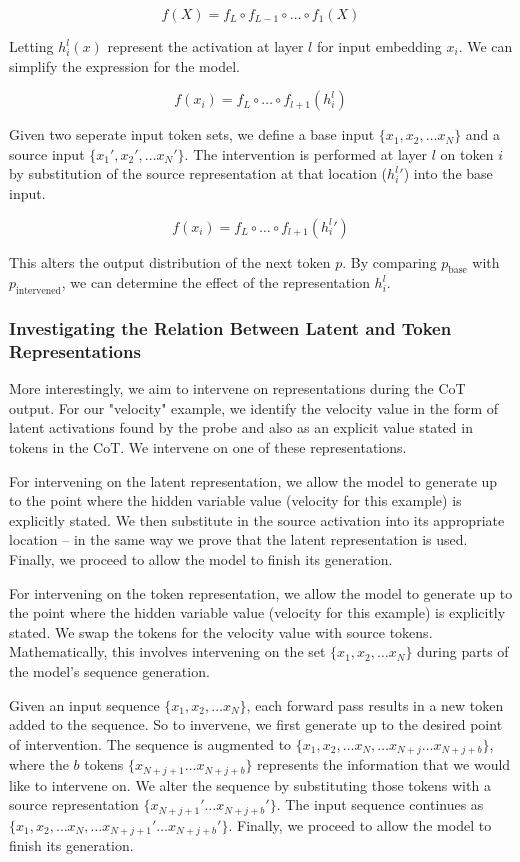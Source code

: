 \documentclass[11pt]{article}
\begin{document}
$$f(X) = f_L \circ f_{L-1}\circ \dots \circ f_1(X)$$

Letting $h_i^l(x)$ represent the activation at layer $l$ for input embedding $x_i$. We can simplify the expression for the model. 

$$f(x_i)=f_L \circ \dots \circ f_{l+1}(h_i^l)$$

Given two seperate input token sets, we define a base input $\{x_1, x_2, \dots x_N\}$ and a source input $\{x_1', x_2', \dots x_N'\}$. The intervention is performed at layer $l$ on token $i$ by substitution of the source representation at that location ($h_i^l'$) into the base input. 

$$f(x_i)=f_L \circ \dots \circ f_{l+1}(h_i^l')$$ 

This alters the output distribution of the next token $p$. By comparing $p_{\text{base}}$ with $p_{\text{intervened}}$, we can determine the effect of the representation $h_i^l$. 

\subsubsection{Investigating the Relation Between Latent and Token Representations}

More interestingly, we aim to intervene on representations during the CoT output. For our "velocity" example, we identify the velocity value in the form of latent activations found by the probe and also as an explicit value stated in tokens in the CoT. We intervene on one of these representations. 

For intervening on the latent representation, we allow the model to generate up to the point where the hidden variable value (velocity for this example) is explicitly stated. We then substitute in the source activation into its appropriate location -- in the same way we prove that the latent representation is used. Finally, we proceed to allow the model to finish its generation. 

For intervening on the token representation, we allow the model to generate up to the point where the hidden variable value (velocity for this example) is explicitly stated. We swap the tokens for the velocity value with source tokens. Mathematically, this involves intervening on the set $\{x_1, x_2, \dots x_N\}$ during parts of the model's sequence generation. 

Given an input sequence $\{x_1, x_2, \dots x_N\}$, each forward pass results in a new token added to the sequence. So to invervene, we first generate up to the desired point of intervention. The sequence is augmented to $\{x_1, x_2, \dots x_N, \dots x_{N+j} \dots x_{N+j+b}\}$, where the $b$ tokens $\{x_{N+j+1} \dots x_{N+j+b}\}$ represents the information that we would like to intervene on. We alter the sequence by substituting those tokens with a source representation $\{x_{N+j+1}' \dots x_{N+j+b}'\}$. The input sequence continues as $\{x_1, x_2, \dots x_N, \dots x_{N+j+1}' \dots x_{N+j+b}'\}$. Finally, we proceed to allow the model to finish its generation. 
\end{document}
